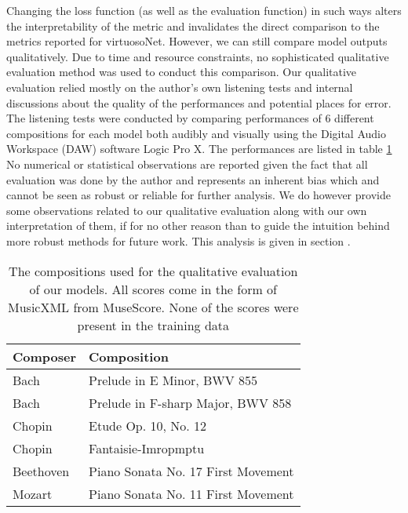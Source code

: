 Changing the loss function (as well as the evaluation function) in such ways alters the interpretability of the metric and invalidates the direct comparison to the metrics reported for virtuosoNet. However, we can still compare model outputs qualitatively. Due to time and resource constraints, no sophisticated qualitative evaluation method was used to conduct this comparison. Our qualitative evaluation relied mostly on the author's own listening tests and internal discussions about the quality of the performances and potential places for error. The listening tests were conducted by comparing performances of 6 different compositions for each model both audibly and visually using the Digital Audio Workspace (DAW) software Logic Pro X. The performances are listed in table \ref{tab:compositions} No numerical or statistical observations are reported given the fact that all evaluation was done by the author and represents an inherent bias which and cannot be seen as robust or reliable for further analysis. We do however provide some observations related to our qualitative evaluation along with our own interpretation of them, if for no other reason than to guide the intuition behind more robust methods for future work. This analysis is given in section .

\begin{table}
    \setlength{\extrarowheight}{3pt}
    \begin{center}
    \begin{tabular}[]{| l | l |}
        \hline
        Composer & Composition \\ 
        \hline 
        Bach & Prelude in E Minor, BWV 855 \\
        Bach & Prelude in F-sharp Major, BWV 858  \\ 
        Chopin & Etude Op. 10, No. 12 \\ 
        Chopin & Fantaisie-Imropmptu \\ 
        Beethoven & Piano Sonata No. 17 First Movement \\ 
        Mozart & Piano Sonata No. 11 First Movement \\ 
        \hline
    \end{tabular}
    \caption{The compositions used for the qualitative evaluation of our models. All scores come in the form of MusicXML from MuseScore. None of the scores were present in the training data}
    \label{tab:compositions}
    \end{center}
\end{table}

